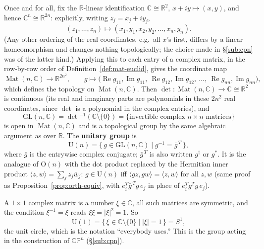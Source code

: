 \documentclass[11pt]{report}
\makeatletter
\newcounter{defcounter}[section]
\newcounter{excounter}[section]
\newcommand{\deflabel}[1]{\edef\@currentlabel{\arabic{section}.\arabic{defcounter}}\label{#1}}
\newcommand{\exlabel}[1]{\edef\@currentlabel{\arabic{section}.\arabic{excounter}}\label{#1}}
\newcommand{\GL}{\mathrm{GL}}
\newcommand{\Ogp}{\mathrm{O}}
\newcommand{\Ugp}{\mathrm{U}}
\DeclareMathOperator{\Mat}{Mat}
\newcommand{\leeref}[1]{\par\smallskip{\raggedleft\footnotesize\textsc{Lee}:\ #1\par}}
\makeatother
\begin{document}
\begin{defbox}\deflabel{def:complex-groups}
Once and for all, fix the $\mathbb{R}$-linear identification $\mathbb{C} \cong \mathbb{R}^2$, $x + iy \mapsto (x, y)$, and hence $\mathbb{C}^n \cong \mathbb{R}^{2n}$: explicitly, writing $z_j = x_j + i y_j$,
\[
(z_1, \ldots, z_n) \longmapsto (x_1, y_1, x_2, y_2, \ldots, x_n, y_n).
\]
(Any other ordering of the real coordinates, e.g.\ all $x$'s first, differs by a linear homeomorphism and changes nothing topologically; the choice made in \S\ref{sub:cpn} was of the latter kind.) Applying this to each entry of a complex matrix, in the row-by-row order of Definition~\ref{def:mat-euclid}, gives the coordinate map
\[
\Mat(n,\mathbb{C}) \longrightarrow \mathbb{R}^{2n^2}, \qquad g \longmapsto \big(\operatorname{Re} g_{11}, \operatorname{Im} g_{11},\ \operatorname{Re} g_{12}, \operatorname{Im} g_{12},\ \ldots,\ \operatorname{Re} g_{nn}, \operatorname{Im} g_{nn}\big),
\]
which defines the topology on $\Mat(n,\mathbb{C})$. Then $\det : \Mat(n,\mathbb{C}) \to \mathbb{C} \cong \mathbb{R}^2$ is continuous (its real and imaginary parts are polynomials in these $2n^2$ real coordinates, since $\det$ is a polynomial in the complex entries), and
\[
\GL(n,\mathbb{C}) = \det{}^{-1}(\mathbb{C} \setminus \{0\}) = \{\text{invertible complex } n \times n \text{ matrices}\}
\]
is open in $\Mat(n,\mathbb{C})$ and is a topological group by the same algebraic argument as over $\mathbb{R}$. The \textbf{unitary group} is
\[
\Ugp(n) = \{\, g \in \GL(n,\mathbb{C}) \mid g^{-1} = \bar{g}^{\,T} \,\},
\]
where $\bar g$ is the entrywise complex conjugate; $\bar g^{\,T}$ is also written $g^\dagger$ or $g^*$. It is the analogue of $\Ogp(n)$ with the dot product replaced by the Hermitian inner product $\langle z, w \rangle = \sum_j z_j \bar w_j$: $g \in \Ugp(n)$ iff $\langle gz, gw \rangle = \langle z, w \rangle$ for all $z, w$ (same proof as Proposition~\ref{prop:orth-equiv}, with $e_i^T \bar{g}^{\,T} g\, e_j$ in place of $e_i^T g^T g\, e_j$).
\leeref{Examples 7.29 and 7.30}
\end{defbox}

\begin{exbox}[$\Ugp(1)$ Is the Circle]\exlabel{ex:1-circle}
A $1 \times 1$ complex matrix is a number $\xi \in \mathbb{C}$, all such matrices are symmetric, and the condition $\xi^{-1} = \bar\xi$ reads $\xi \bar\xi = |\xi|^2 = 1$. So
\[
\Ugp(1) = \{\, \xi \in \mathbb{C} \setminus \{0\} \mid |\xi| = 1 \,\} = S^1,
\]
the unit circle, which is the notation ``everybody uses.'' This is the group acting in the construction of $\mathbb{CP}^n$ (\S\ref{sub:cpn}).
\end{exbox}
\end{document}
